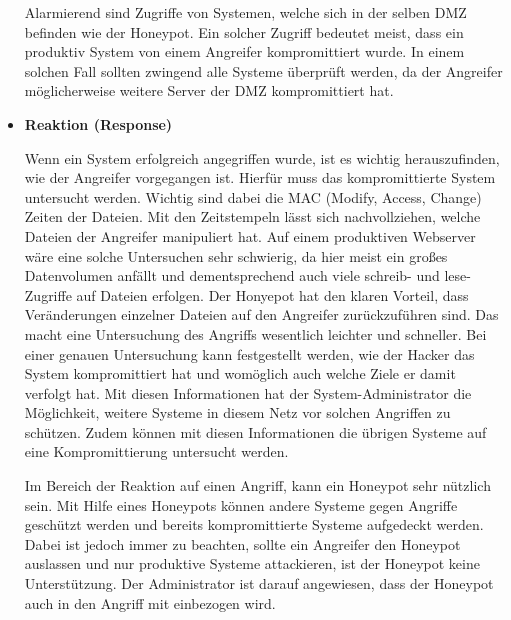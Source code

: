 \begin{itemize}
Alarmierend sind Zugriffe von Systemen, welche sich in der selben DMZ befinden wie der Honeypot. Ein solcher Zugriff bedeutet meist, dass ein produktiv System von einem Angreifer kompromittiert wurde. In einem solchen Fall sollten zwingend alle Systeme überprüft werden, da der Angreifer möglicherweise weitere Server der DMZ kompromittiert hat.
\item{\textbf{Reaktion (Response)}}

Wenn ein System erfolgreich angegriffen wurde, ist es wichtig herauszufinden, wie der Angreifer vorgegangen ist. Hierfür muss das kompromittierte System untersucht werden. Wichtig sind dabei die MAC (Modify, Access, Change) Zeiten der Dateien. Mit den Zeitstempeln lässt sich nachvollziehen, welche Dateien der Angreifer manipuliert hat. Auf einem produktiven Webserver wäre eine solche Untersuchen sehr schwierig, da hier meist ein großes Datenvolumen anfällt und dementsprechend auch viele schreib- und lese-Zugriffe auf Dateien erfolgen. Der Honyepot hat den klaren Vorteil, dass  Veränderungen einzelner Dateien auf den Angreifer zurückzuführen sind. Das macht eine Untersuchung des Angriffs wesentlich leichter und schneller. 
Bei einer genauen Untersuchung kann festgestellt werden, wie der Hacker das System kompromittiert hat und womöglich auch welche Ziele er damit verfolgt hat. Mit diesen Informationen hat der System-Administrator die Möglichkeit, weitere Systeme in diesem Netz vor solchen Angriffen zu schützen. 
Zudem können mit diesen Informationen die übrigen Systeme auf eine Kompromittierung untersucht werden.

Im Bereich der Reaktion auf einen Angriff, kann ein Honeypot sehr nützlich sein. Mit Hilfe eines Honeypots können andere Systeme gegen Angriffe geschützt werden und bereits kompromittierte Systeme aufgedeckt werden. Dabei ist jedoch immer zu beachten, sollte ein Angreifer den Honeypot auslassen und nur produktive Systeme attackieren, ist der Honeypot keine Unterstützung. Der Administrator ist darauf angewiesen, dass der Honeypot auch in den Angriff mit einbezogen wird.

\end{itemize}